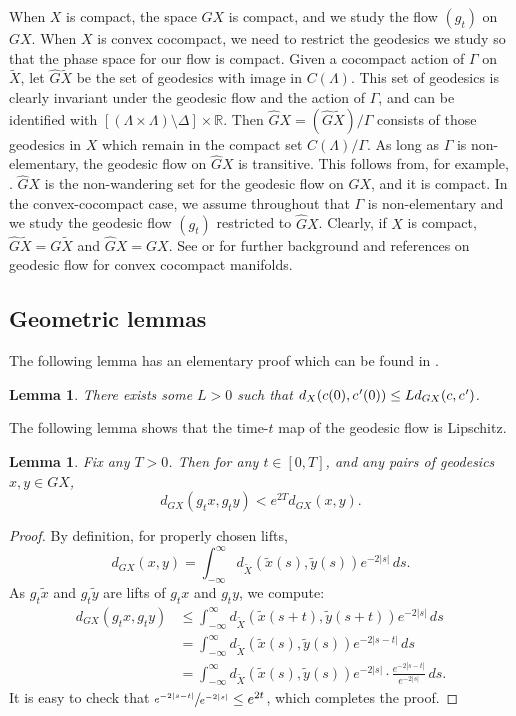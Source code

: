 \documentclass[10pt]{amsart}
\newcommand{\cpr}{c\mkern1mu'}
\newtheorem{lem}[thm]{Lemma}
\theoremstyle{definition}
\numberwithin{equation}{section}
\begin{document}
When $X$ is compact, the space $GX$ is compact, and we study the flow $(g_t)$ on $GX$. When $X$ is convex cocompact, we need to restrict the geodesics we study so that the phase space for our flow is compact. Given a cocompact action of $\Gamma$ on $\tilde X$, let $\hat G\tilde X$ be the set of geodesics with image in $C(\Lambda)$. This set of geodesics is clearly invariant under the geodesic flow and the action of $\Gamma$, and can be identified with $[(\Lambda \times \Lambda)\setminus \Delta]\times \mathbb{R}$. Then $\hat G X = (\hat G\tilde X)/\Gamma$ consists of those geodesics in $X$ which remain in the compact set $C(\Lambda)/\Gamma$. As long as $\Gamma$ is non-elementary, the geodesic flow on $\hat GX$ is transitive. This follows from, for example, \cite[\S8.2]{gromov}. $\hat GX$ is the non-wandering set for the geodesic flow on $GX$, and it is compact. In the convex-cocompact case, we assume throughout that $\Gamma$ is non-elementary and we study the geodesic flow $(g_t)$ restricted to $\hat G X$. Clearly, if $X$ is compact, $\hat G\tilde X = G\tilde X$ and $\hat GX = GX$. See \cite{tapie} or \cite{mB95} for further background and references on geodesic flow for convex cocompact manifolds.

\subsection{Geometric lemmas}

The following lemma has an elementary proof which can be found in \cite[Lem.\,2.8]{CLT}.

\begin{lem}\label{lem:X GX bound}
There exists some $L>0$ such that $d_X(c(0), \cpr(0)) \leq L d_{GX}(c,\cpr)$.
\end{lem}

The following lemma shows that the time-$t$ map of the geodesic flow is Lipschitz.
\begin{lem}\label{lem:Lipschitz}
Fix any $T>0$. Then for any $t\in[0,T]$, and any pairs of geodesics $x,y\in GX$,
\[ d_{GX}(g_t x, g_t y) < e^{2T} d_{GX}(x,y). \]
\end{lem}

\begin{proof}
By definition, for properly chosen lifts,
\[ d_{GX}(x,y) = \int_{-\infty}^\infty d_{\tilde X}(\tilde x(s), \tilde y(s)) e^{-2|s|}\,ds. \]
As $g_t\tilde x$ and $g_t\tilde y$ are lifts of $g_tx$ and $g_ty$, we compute:
\begin{align*}
d_{GX}(g_tx,g_ty) & \leq \int_{-\infty}^\infty d_{\tilde X}(\tilde x(s+t),\tilde y(s+t))e^{-2|s|}\,ds \\
& = \int_{-\infty}^\infty d_{\tilde X}(\tilde x(s),\tilde y(s))e^{-2|s-t|}\,ds \\
& = \int_{-\infty}^\infty d_{\tilde X}(\tilde x(s),\tilde y(s))e^{-2|s|}\cdot \frac{e^{-2|s-t|}}{e^{-2|s|}}\,ds.  
\end{align*}
It is easy to check that $\sfrac{e^{-2|s-t|}}{e^{-2|s|}} \leq e^{2t}$, which completes the proof.
\end{proof}
\end{document}
